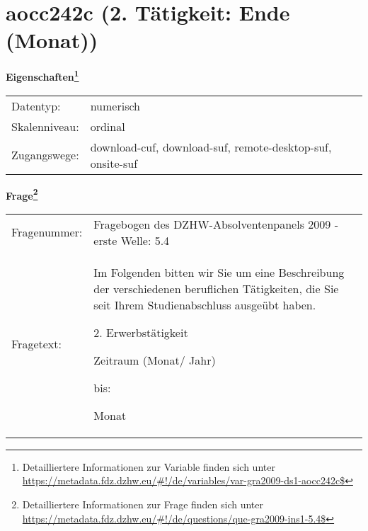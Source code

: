 
    \setcounter{footnote}{0}

    \vspace*{-1.8cm}
	\section{aocc242c (2. Tätigkeit: Ende (Monat))}
	\label{section:aocc242c}



    \vspace*{0.5cm}
    \noindent\textbf{Eigenschaften\footnote{Detailliertere Informationen zur Variable finden sich unter
		\url{https://metadata.fdz.dzhw.eu/\#!/de/variables/var-gra2009-ds1-aocc242c$}}}\\
	\begin{tabularx}{\hsize}{@{}lX}
	Datentyp: & numerisch \\
	Skalenniveau: & ordinal \\
	Zugangswege: &
	  download-cuf, 
	  download-suf, 
	  remote-desktop-suf, 
	  onsite-suf
 \\
    \end{tabularx}



				\vspace*{0.5cm}
                \noindent\textbf{Frage\footnote{Detailliertere Informationen zur Frage finden sich unter
		              \url{https://metadata.fdz.dzhw.eu/\#!/de/questions/que-gra2009-ins1-5.4$}}}\\
				\begin{tabularx}{\hsize}{@{}lX}
					Fragenummer: &
					  Fragebogen des DZHW-Absolventenpanels 2009 - erste Welle:
					  5.4
 \\
					Fragetext: & Im Folgenden bitten wir Sie um eine Beschreibung der verschiedenen beruflichen Tätigkeiten, die Sie seit Ihrem Studienabschluss ausgeübt haben.\par  2. Erwerbstätigkeit\par  Zeitraum (Monat/ Jahr)\par  bis:\par  Monat \\
				\end{tabularx}





